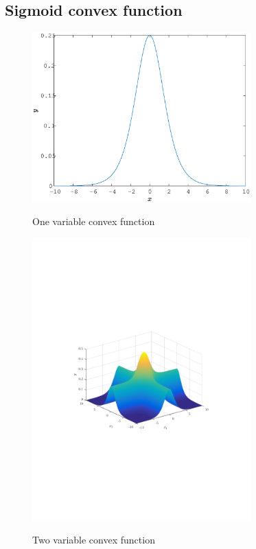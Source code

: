 \documentclass[letterpaper, 12pt]{article}
\begin{document}
\subsection{Sigmoid convex function}
\begin{figure}
	\centering
	\includegraphics[width=0.75\textwidth]{Matlab/1FactorsSigmoid}
	\label{Fig:OneVarSigmoid}
	\caption{One variable convex function}
\end{figure}
\begin{figure}
	\centering
	\includegraphics[width=0.75\textwidth]{Matlab/2FactorsSigmoid}
	\label{Fig:MultiVarSigmoid}
	\caption{Two variable convex function}
\end{figure}
\end{document}
